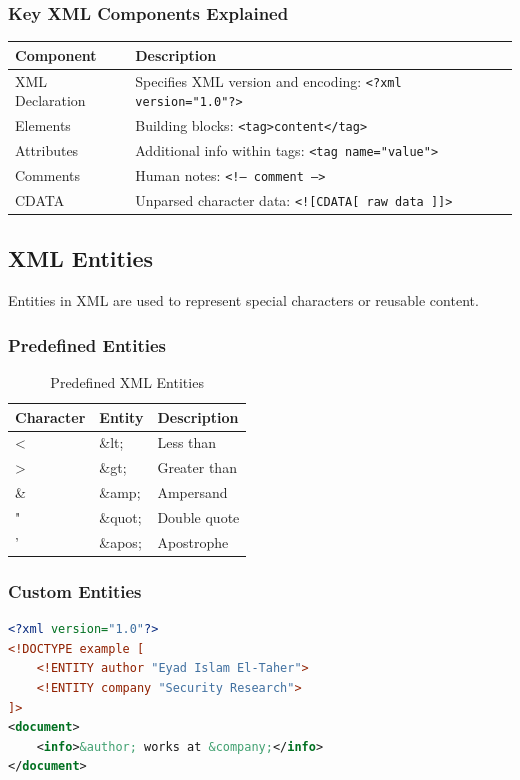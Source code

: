 \documentclass{article}
\begin{document}
\subsubsection{Key XML Components Explained}
\begin{table}[h]
\centering
\begin{tabular}{ll}
\toprule
\textbf{Component} & \textbf{Description} \\
\midrule
XML Declaration & Specifies XML version and encoding: \texttt{<?xml version="1.0"?>} \\
Elements & Building blocks: \texttt{<tag>content</tag>} \\
Attributes & Additional info within tags: \texttt{<tag name="value">} \\
Comments & Human notes: \texttt{<!-- comment -->} \\
CDATA & Unparsed character data: \texttt{<![CDATA[ raw data ]]>} \\
\bottomrule
\end{tabular}
\end{table}

\subsection{XML Entities}
Entities in XML are used to represent special characters or reusable content.

\subsubsection{Predefined Entities}
\begin{table}[h]
\centering
\begin{tabular}{lll}
\toprule
\textbf{Character} & \textbf{Entity} & \textbf{Description} \\
\midrule
< & \&lt; & Less than \\
> & \&gt; & Greater than \\
\& & \&amp; & Ampersand \\
" & \&quot; & Double quote \\
' & \&apos; & Apostrophe \\
\bottomrule
\end{tabular}
\caption{Predefined XML Entities}
\end{table}

\subsubsection{Custom Entities}
\begin{lstlisting}[language=XML, caption=Custom Entity Declaration]
<?xml version="1.0"?>
<!DOCTYPE example [
    <!ENTITY author "Eyad Islam El-Taher">
    <!ENTITY company "Security Research">
]>
<document>
    <info>&author; works at &company;</info>
</document>
\end{lstlisting}
\end{document}
